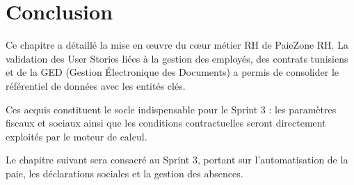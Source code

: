 \section*{Conclusion}
\label{sec:s2-conclusion}

Ce chapitre a détaillé la mise en œuvre du cœur métier RH de PaieZone RH. La validation des User Stories liées à la gestion des employés, des contrats tunisiens et de la GED (Gestion Électronique des Documents) a permis de consolider le référentiel de données avec les entités clés.

Ces acquis constituent le socle indispensable pour le Sprint 3 : les paramètres fiscaux et sociaux ainsi que les conditions contractuelles seront directement exploités par le moteur de calcul.

Le chapitre suivant sera consacré au Sprint 3, portant sur l'automatisation de la paie, les déclarations sociales et la gestion des absences.


